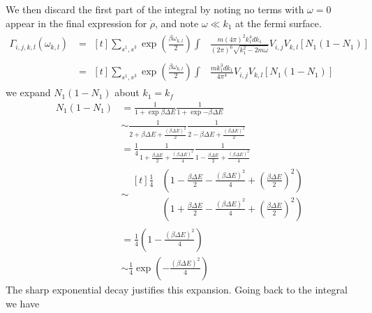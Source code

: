 We then discard the first part of the integral by noting no
terms with \(\omega = 0\) appear in the
final expression for \(\dot{\rho}\), and note
\(\omega \ll k_1\) at the fermi surface.
\begin{align}
  \Gamma_{i,j, k,l}(\omega_{k,l}) & =\begin{aligned}[t]
    \sum_{s^1,s^3} \exp{(\frac{\beta \omega_{k,l}}{2})} \int &
    \frac{m{(4\pi)}^2 k_1^4 dk_1}{{(2\pi)}^6\sqrt{k_1^2 - 2m\omega}}
    V_{i,j} V_{k,l} [ N_1 (1 - N_1)]
  \end{aligned} \\
                                  & =\begin{aligned}[t]
    \sum_{s^1,s^3} \exp{(\frac{\beta \omega_{k,l}}{2})} \int &
    \frac{m k_1^3 dk_1}{4\pi^4}
    V_{i,j} V_{k,l} [ N_1 (1 - N_1)]
  \end{aligned}
\end{align}
we expand \(N_1 (1 - N_1)\) about \(k_1 = k_f\)
\begin{align}
  N_1 (1 - N_1) & = \frac{1}{1 + \exp{\beta \Delta E}}
  \frac{1}{1 + \exp{-\beta \Delta E}}                                                \\
                & \sim \frac{1}{2 + \beta \Delta E + \frac{{(\beta \Delta E)}^2}{2}}
  \frac{1}{2 - \beta \Delta E + \frac{{(\beta \Delta E)}^2}{2}}                      \\
                & = \frac{1}{4}
  \frac{1}{1 + \frac{\beta \Delta E}{2} + \frac{{(\beta \Delta E)}^2}{4}}
  \frac{1}{1 - \frac{\beta \Delta E}{2} + \frac{{(\beta \Delta E)}^2}{4}}            \\
                & \sim \begin{aligned}[t]
    \frac{1}{4}
     & (1 - \frac{\beta \Delta E}{2} - \frac{{(\beta \Delta E)}^2}{4} + {(\frac{\beta \Delta E}{2})}^2) \\
     & (1 + \frac{\beta \Delta E}{2} - \frac{{(\beta \Delta E)}^2}{4} + {(\frac{\beta \Delta E}{2})}^2)
  \end{aligned}                                    \\
                & = \frac{1}{4}(1 - \frac{{(\beta \Delta E)}^2}{4})                  \\
                & \sim \frac{1}{4}\exp{(- \frac{{(\beta \Delta E)}^2}{4})}
\end{align}
The sharp exponential decay justifies
this expansion. Going back to the
integral we have

